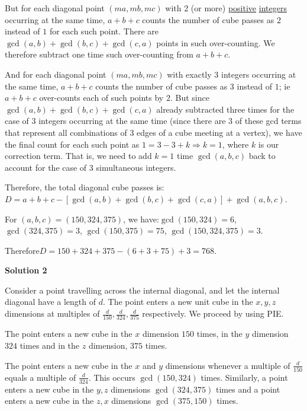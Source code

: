 \begin{enumerate}
 But for each diagonal point $(ma,mb,mc)$ with 2 (or more) \href{https://artofproblemsolving.com/wiki/index.php?title=Positive}{positive} \href{https://artofproblemsolving.com/wiki/index.php?title=Integer}{integers} occurring at the same time, $a+b+c$ counts the number of cube passes as $2$ instead of $1$ for each such point.  There are $\gcd(a,b)+\gcd(b,c)+\gcd(c,a)$ points in such over-counting. We therefore subtract one time such over-counting from $a+b+c$.

 And for each diagonal point $(ma,mb,mc)$ with exactly $3$ integers occurring at the same time, $a+b+c$ counts the number of cube passes as $3$ instead of $1$; ie $a+b+c$ over-counts each of such points by $2$. But since $\gcd(a,b)+\gcd(b,c)+\gcd(c,a)$ already subtracted three times for the case of $3$ integers occurring at the same time (since there are $3$ of these gcd terms that represent all combinations of 3 edges of a cube meeting at a vertex), we  have the final count for each such point as $1 = 3-3+k \Rightarrow k=1$, where $k$ is our correction term. That is, we need to add $k=1$ time $\gcd(a,b,c)$ back to account for the case of 3 simultaneous integers.

 Therefore, the total diagonal cube passes is:$D = a+b+c-\left[ \gcd(a,b)+\gcd(b,c)+\gcd(c,a) \right]+\gcd(a,b,c)$.

 For $(a,b,c) = (150, 324, 375)$, we have:$\gcd(150,324)=6$, $\gcd(324,375)=3$, $\gcd(150,375)=75$, $\gcd(150,324,375)=3$.

 Therefore$D = 150+324+375-(6+3+75)+3 = \boxed{768}$.

 



\textbf{Solution 2}

Consider a point travelling across the internal diagonal, and let the internal diagonal have a length of $d$. The point enters a new unit cube in the $x,y,z$ dimensions at multiples of $\frac{d}{150}, \frac{d}{324}, \frac{d}{375}$ respectively. We proceed by using PIE.

 The point enters a new cube in the $x$ dimension $150$ times, in the $y$ dimension $324$ times and in the $z$ dimension, $375$ times.

 The point enters a new cube in the $x$ and $y$ dimensions whenever a multiple of $\frac{d}{150}$ equals a multiple of $\frac{d}{324}$. This occurs $\gcd(150, 324)$ times. Similarly, a point enters a new cube in the $y,z$ dimensions $\gcd(324, 375)$ times and a point enters a new cube in the $z,x$ dimensions $\gcd(375, 150)$ times.


\end{enumerate}
